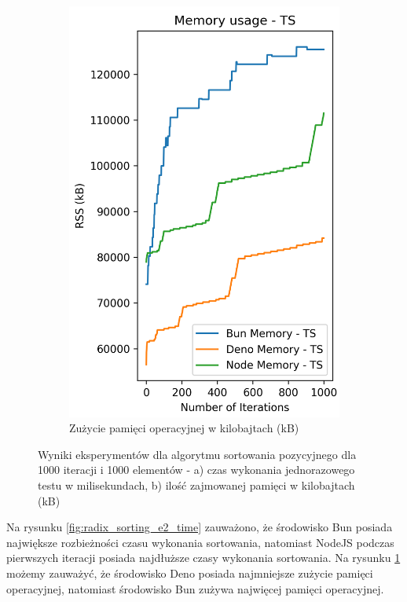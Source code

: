 \begin{figure}[H]
\begin{subfigure}[b]{0.44\textwidth}
  \end{subfigure}
  \begin{subfigure}[b]{0.44\textwidth}
    \centering
    \includegraphics[width=\textwidth]{Figures/sorting/sorting_radix_1000_1000_ts_memory.png}
    \caption{Zużycie pamięci operacyjnej w kilobajtach (kB)}
    \label{fig:radix_sorting_e2_ts_memory}
  \end{subfigure}
  \caption{Wyniki eksperymentów dla algorytmu sortowania pozycyjnego dla 1000 iteracji i 1000 elementów - a) czas wykonania jednorazowego testu w milisekundach, b) ilość zajmowanej pamięci w kilobajtach (kB)}
  \label{fig:radix_sorting_e2_ts}
\end{figure}

Na rysunku \ref{fig:radix_sorting_e2_time} zauważono, że środowisko Bun posiada największe rozbieżności czasu wykonania sortowania, natomiast NodeJS podczas pierwszych iteracji posiada najdłuższe czasy wykonania sortowania. Na rysunku \ref{fig:radix_sorting_e2_ts_memory} możemy zauważyć, że środowisko Deno posiada najmniejsze zużycie pamięci operacyjnej, natomiast środowisko Bun zużywa najwięcej pamięci operacyjnej. 

